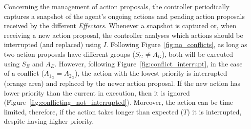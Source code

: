 Concerning the management of action proposals, the controller periodically captures a snapshot of the agent's ongoing actions and pending action proposals received by the different \textit{Effectors}. Whenever a snapshot is captured or, when receiving a new action proposal, the controller analyses which actions should be interrupted (and replaced) using $I$. Following Figure~\ref{fig:no_conflicts}, as long as two action proposals have different groups ($S_G \neq A_G$), both will be executed using $S_E$ and $A_E$. However, following Figure~\ref{fig:conflict_interrupt}, in the case of a conflict ($A_{1_G}=A_{2_G}$), the action with the lowest priority is interrupted (orange area) and replaced by the newer action proposal. If the new action has lower priority than the current in execution, then it is ignored (Figure~\ref{fig:conflicting_not_interrupted}). Moreover, the action can be time limited, therefore, if the action takes longer than expected ($T$) it is interrupted, despite having higher priority.

